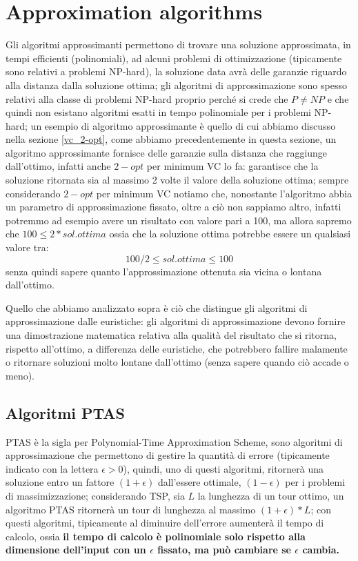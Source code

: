 \documentclass[12pt,a4paper]{article}
\begin{document}
\section{Approximation algorithms}
Gli algoritmi approssimanti permettono di trovare una soluzione approssimata, in tempi efficienti (polinomiali), ad alcuni problemi di ottimizzazione (tipicamente sono relativi a problemi NP-hard), la soluzione data avrà delle garanzie riguardo alla distanza dalla soluzione ottima; gli algoritmi di approssimazione sono spesso relativi alla classe di problemi NP-hard proprio perché si crede che $P \neq NP$ e che quindi non esistano algoritmi esatti in tempo polinomiale per i problemi NP-hard; un esempio di algoritmo approssimante è quello di cui abbiamo discusso nella sezione \ref{vc_2-opt}, come abbiamo precedentemente in questa sezione, un algoritmo approssimante fornisce delle garanzie sulla distanza che raggiunge dall'ottimo, infatti anche $2-opt$ per minimum VC lo fa: garantisce che la soluzione ritornata sia al massimo 2 volte  il valore della soluzione ottima; sempre considerando $2-opt$ per minimum VC notiamo che, nonostante l'algoritmo abbia un parametro di approssimazione fissato, oltre a ciò non sappiamo altro, infatti potremmo ad esempio avere un risultato con valore pari a 100, ma allora sapremo che $100 \leq 2*sol.ottima$ ossia che la soluzione ottima potrebbe essere un qualsiasi valore tra: $$100/2 \leqslant sol.ottima \leqslant 100$$ senza quindi sapere quanto l'approssimazione ottenuta sia vicina o lontana dall'ottimo.

Quello che abbiamo analizzato sopra è ciò che distingue gli algoritmi di approssimazione dalle euristiche: gli algoritmi di approssimazione devono fornire una dimostrazione matematica relativa alla qualità del risultato che si ritorna, rispetto all'ottimo, a differenza delle euristiche, che potrebbero fallire malamente o ritornare soluzioni molto lontane dall'ottimo (senza sapere quando ciò accade o meno).

\subsection{Algoritmi PTAS}
PTAS è la sigla per Polynomial-Time Approximation Scheme, sono algoritmi di approssimazione che permettono di gestire la quantità di errore (tipicamente indicato con la lettera $\epsilon > 0$), quindi, uno di questi algoritmi, ritornerà una soluzione entro un fattore $(1 + \epsilon)$ dall'essere ottimale, $(1 - \epsilon)$ per i problemi di massimizzazione; considerando TSP, sia $L$ la lunghezza di un tour ottimo,  un algoritmo PTAS ritornerà un tour di lunghezza al massimo $(1 + \epsilon) * L$; con questi algoritmi, tipicamente al diminuire dell'errore aumenterà il tempo di calcolo, ossia \textbf{il tempo di calcolo è polinomiale solo rispetto alla dimensione dell'input con un $\epsilon$ fissato, ma può cambiare se $\epsilon$ cambia.}
\end{document}
